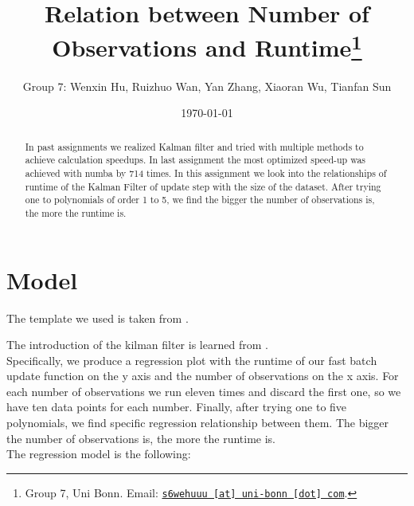 \documentclass[11pt, a4paper, leqno]{article}
\begin{document}
\title{Relation between Number of Observations and Runtime\thanks{Group 7, Uni Bonn. Email: \href{mailto:s6wehuuu@uni-bonn.com}{\nolinkurl{s6wehuuu [at] uni-bonn [dot] com}}.}}

\author{Group 7: Wenxin Hu, Ruizhuo Wan, Yan Zhang, Xiaoran Wu, Tianfan Sun}

\date{
\today
}

\maketitle


\begin{abstract}

     In past assignments we realized Kalman filter and tried with multiple methods to achieve calculation speedups. In last assignment the most optimized speed-up was achieved with numba by 714 times. In this assignment we look into the relationships of runtime of the Kalman Filter of update step with the size of the dataset. After trying one to polynomials of order 1 to 5, we find the bigger the number of observations is, the more the runtime is.
   

\end{abstract}
\clearpage

\section{Model} %
\label{sec:Model}

The template we used is taken from \citet{GaudeckerEconProjectTemplates}.

The introduction of the kilman filter is learned from \citet{Gabler18}. \\



Specifically, we produce a regression plot with the runtime of our fast batch update function on the y axis and the number of observations on the x axis. For each number of observations we run eleven times and discard the first one, so we have ten data points for each number. Finally, after trying one to five polynomials, we find specific regression relationship between them. The bigger the number of observations is, the more the runtime is.\\

   

The regression model is the following:


\clearpage
\end{document}
